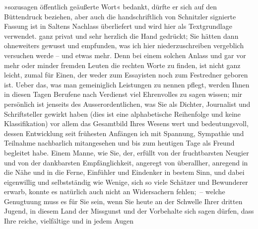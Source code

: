 \begin{ledgroupsized}[t]{13cm}
{{{                     »sozusagen öffentlich geäußerte Wort« bedankt, dürfte er sich auf den Büttendruck beziehen, aber auch die handschriftlich von Schnitzler signierte Fassung ist in Saltens Nachlass überliefert und wird hier als
                  Textgrundlage verwendet.}}}\label{K_L02950-1h} ganz privat und sehr herzlich die Hand gedrückt;
               Sie hätten dann ohneweiters gewusst und empfunden, was ich hier niederzuschreiben
               vergeblich versuchen werde – und etwas mehr. Denn bei einem solchen Anlass und gar
               vor mehr oder minder fremden Leuten die rechten Worte zu finden, ist nicht ganz
               leicht, zumal für Einen, der weder zum Essayisten noch zum Festredner geboren
               ist.\pend
           \pstart
           Ueber das, was man gemeiniglich Leistungen zu nennen pflegt, werden Ihnen in diesen
               Tagen Berufene nach Verdienst viel Ehrenvolles zu sagen wissen; mir persönlich ist
                   jenseits 
               des Ausserordentlichen, was Sie als Dichter, Journalist und Schriftsteller gewirkt
               haben (dies ist eine alphabetische Reihenfolge und keine Klassifikation) {\pb}\introOben{}vor allem\introOben{} das Gesamtbild Ihres Wesens wert und
               bedeutungsvoll, dessen Entwicklung seit frühesten Anfängen ich mit Spannung,
               Sympathie und Teilnahme nachbarlich mitangesehen und bis zum heutigen Tage als Freund
               begleitet habe. Einem Manne, wie Sie, der, erfüllt von der fruchtbarsten Neugier und
               von der dankbarsten Empfänglichkeit, angeregt von überallher, anregend in die Nähe
               und in die Ferne, Einfühler und Eindenker in bestem Sinn, und dabei eigenwillig und
               selbstständig wie Wenige, sich so viele Schätzer und Bewunderer erwarb, konnte es
               natürlich auch nicht an Widersachern fehlen; – welche Genugtuung muss es für Sie sein,
               wenn Sie heute an der Schwelle Ihrer dritten Jugend, in diesem Land der Missgunst und
               der Vorbehalte sich sagen dürfen, dass Ihre reiche, vielfältige und in jedem
               Augen\label{T_L02950-1v}
\end{ledgroupsized}
